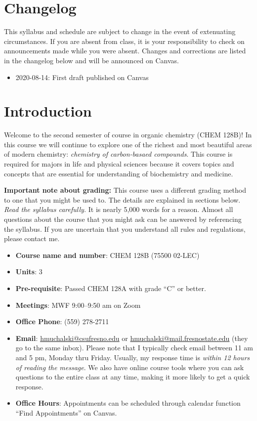\hypertarget{changelog}{%
\section{Changelog}\label{changelog}}

This syllabus and schedule are subject to change in the event of
extenuating circumstances. If you are absent from class, it is your
responsibility to check on announcements made while you were absent.
Changes and corrections are listed in the changelog below and will be
announced on Canvas.

\begin{itemize}
\tightlist
\item
  2020-08-14: First draft published on Canvas
\end{itemize}

\newpage

\hypertarget{introduction}{%
\section{Introduction}\label{introduction}}

Welcome to the second semester of course in organic chemistry (CHEM
128B)! In this course we will continue to explore one of the richest and
most beautiful areas of modern chemistry: \emph{chemistry of
carbon-basaed compounds}. This course is required for majors in life and
physical sciences because it covers topics and concepts that are
essential for understanding of biochemistry and medicine.

\textbf{Important note about grading:} This course uses a different
grading method to one that you might be used to. The details are
explained in sections below. \emph{Read the syllabus carefully.} It is
nearly 5,000 words for a reason. Almost all questions about the course
that you might ask can be answered by referencing the syllabus. If you
are uncertain that you understand all rules and regulations, please
contact me.

\begin{itemize}
\tightlist
\item
  \textbf{Course name and number}: CHEM 128B (75500 02-LEC)
\item
  \textbf{Units}: 3
\item
  \textbf{Pre-requisite}: Passed CHEM 128A with grade ``C'' or better.
\item
  \textbf{Meetings}: MWF 9:00--9:50 am on Zoom
\item
  \textbf{Office Phone}: (559) 278-2711
\item
  \textbf{Email}: \url{hmuchalski@csufresno.edu} or
  \url{hmuchalski@mail.fresnostate.edu} (they go to the same inbox).
  Please note that I typically check email between 11 am and 5 pm,
  Monday thru Friday. Usually, my response time is \emph{within 12 hours
  of reading the message}. We also have online course tools where you
  can ask questions to the entire class at any time, making it more
  likely to get a quick response.
\item
  \textbf{Office Hours}: Appointments can be scheduled through calendar
  function ``Find Appointments'' on Canvas.
\end{itemize}

